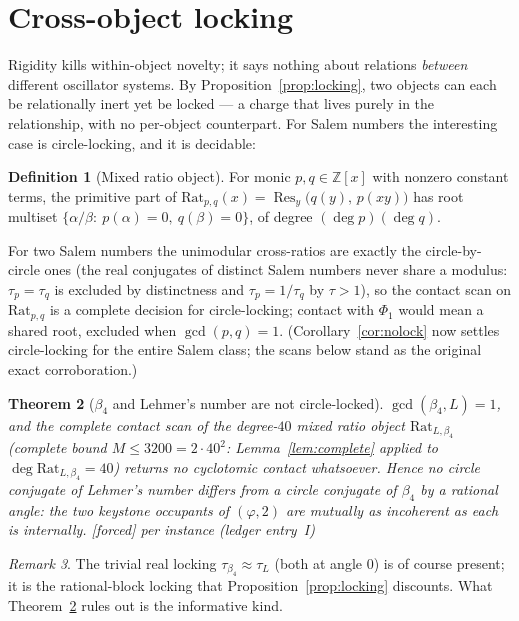 \documentclass[11pt]{article}
\theoremstyle{plain}
\newtheorem{theorem}{Theorem}[section]
\theoremstyle{definition}
\newtheorem{definition}[theorem]{Definition}
\theoremstyle{remark}
\newtheorem{remark}[theorem]{Remark}
\newcommand{\Z}{\mathbb{Z}}
\newcommand{\Rat}{\mathrm{Rat}}
\DeclareMathOperator{\Res}{Res}
\newcommand{\F}{\textnormal{[forced]}}
\begin{document}
\section{Cross-object locking}\label{sec:locking}

Rigidity kills within-object novelty; it says nothing about relations
\emph{between} different oscillator systems. By
Proposition~\ref{prop:locking}, two objects can each be relationally inert yet
be locked --- a charge that lives purely in the relationship, with no per-object
counterpart. For Salem numbers the interesting case is circle-locking, and it is
decidable:

\begin{definition}[Mixed ratio object]
For monic $p,q\in\Z[x]$ with nonzero constant terms, the primitive part of
$\Rat_{p,q}(x)=\Res_y\bigl(q(y),\,p(xy)\bigr)$ has root multiset
$\{\alpha/\beta:\ p(\alpha)=0,\ q(\beta)=0\}$, of degree $(\deg p)(\deg q)$.
\end{definition}

For two Salem numbers the unimodular cross-ratios are exactly the
circle-by-circle ones (the real conjugates of distinct Salem numbers never share
a modulus: $\tau_p=\tau_q$ is excluded by distinctness and
$\tau_p=1/\tau_q$ by $\tau>1$), so the contact scan on $\Rat_{p,q}$ is a
complete decision for circle-locking; contact with $\Phi_1$ would mean a shared
root, excluded when $\gcd(p,q)=1$. (Corollary~\ref{cor:nolock} now settles
circle-locking for the entire Salem class; the scans below stand as the
original exact corroboration.)

\begin{theorem}[$\beta_4$ and Lehmer's number are not circle-locked]
\label{thm:notlocked}
$\gcd(\beta_4,L)=1$, and the complete contact scan of the degree-$40$ mixed
ratio object $\Rat_{L,\beta_4}$ (complete bound $M\le3200=2\cdot40^2$:
Lemma~\ref{lem:complete} applied to $\deg\Rat_{L,\beta_4}=40$) returns
\emph{no} cyclotomic
contact whatsoever. Hence no circle conjugate of Lehmer's number differs from a
circle conjugate of $\beta_4$ by a rational angle: the two keystone occupants of
$(\varphi,2)$ are mutually as incoherent as each is internally. \F{} per
instance (ledger entry~I)
\end{theorem}

\begin{remark}
The trivial real locking $\tau_{\beta_4}\approx\tau_L$ (both at angle $0$) is of
course present; it is the rational-block locking that
Proposition~\ref{prop:locking} discounts. What Theorem~\ref{thm:notlocked} rules
out is the informative kind.
\end{remark}
\end{document}
